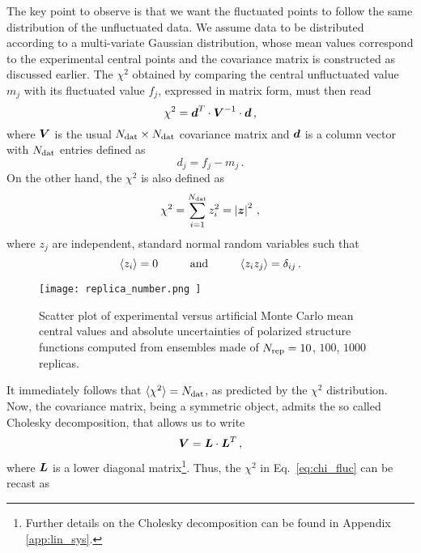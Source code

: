 The key point to observe is that we want the fluctuated points to follow the same distribution of the unfluctuated data. We assume data to be distributed according to a multi-variate Gaussian distribution, whose mean values correspond to the experimental central points and the covariance matrix is constructed as discussed earlier. The $\chi^2$ obtained by comparing the central unfluctuated value $m_j$ with its fluctuated value $f_j$, expressed in matrix form, must then read
\begin{equation}
  \chi^2 = {\vb*{d}}^{T} \cdot \vb*{V}^{-1} \cdot \vb*{d} \,,
  \label{eq:chi_fluc}
\end{equation}
where $\vb*{V}$ is the usual $N_{\textrm{dat}} \times N_{\textrm{dat}}$ covariance matrix and $\vb*{d}$ is a column vector with $N_{\textrm{dat}}$ entries defined as
\begin{equation}
  d_j = f_j - m_j \,.
\end{equation}
On the other hand, the $\chi^2$ is also defined as
\begin{equation}
  \chi^2 = \sum_{i=1}^{N_{\textrm{dat}}} z_i^2 = \left| \vb*{z} \right|^2 \,,
  \label{eq:chi2_normal}
\end{equation}
where $z_j$ are independent, standard normal random variables such that
\begin{equation}
  \langle z_i \rangle = 0 \hspace{10mm} \T{and} \hspace{10mm}  \langle z_i z_j \rangle = \delta_{ij} \,.
\end{equation}
\begin{figure}[t]
  \centering
  \texttt{[image: replica\_number.png ]} 
  \caption{\small{Scatter plot of experimental versus artificial Monte Carlo mean central values and absolute uncertainties of polarized structure functions computed from ensembles made of $N_{\textrm{rep}} = 10$, $100$, $1000$ replicas.}}
  \label{fig:replica_number}
\end{figure}
It immediately follows that $\langle \chi^2 \rangle = N_{\textrm{dat}}$, as predicted by the $\chi^2$ distribution. Now, the covariance matrix, being a symmetric object, admits the so called Cholesky decomposition, that allows us to write
\begin{equation}
  \vb*{V} = \vb*{L} \cdot {\vb*{L}}^{T} \,,
\end{equation}
where $\vb*{L}$ is a lower diagonal matrix\footnote{Further details on the Cholesky decomposition can be found in Appendix \ref{app:lin_sys}.}. Thus, the $\chi^2$ in Eq.~\eqref{eq:chi_fluc} can be recast as

